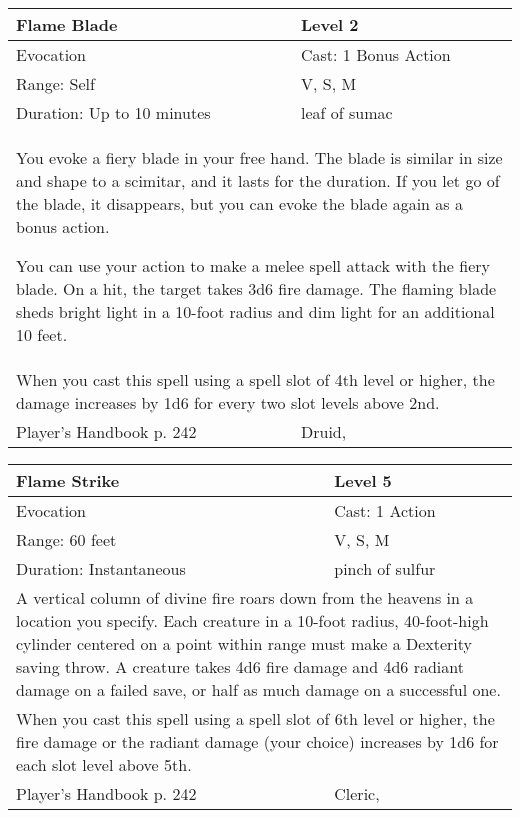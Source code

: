 \documentclass[11pt]{report}
\begin{document}
\begin{table}[H]
	\begin{tabular}{||p{6cm}|p{6cm}||}
		\hline\hline
		\bf{Flame Blade} & Level 2\\ \hline
		Evocation & Cast: 1 Bonus Action\\ \hline
		Range: Self & V, S, M\\ \hline
		Duration: Up to 10 minutes & leaf of sumac\\ \hline
		\multicolumn{2}{||p{12cm}||}{You evoke a fiery blade in your free hand. 
The blade is similar in size and shape to a scimitar, and it lasts for the duration. If you let go of the blade, it disappears, but you can evoke the blade again as a bonus action.

You can use your action to make a melee spell attack with the fiery blade. On a hit, the target takes 3d6 fire damage. 
The flaming blade sheds bright light in a 10-foot radius and dim light for an additional 10 feet.}\\ \hline
		\multicolumn{2}{||p{12cm}||}{When you cast this spell using a spell slot of 4th level or higher, the damage increases by 1d6 for every two slot levels above 2nd.}\\ \hline
Player's Handbook p. 242 & Druid, \\ \hline\hline
	\end{tabular}
\end{table}

\begin{table}[H]
	\begin{tabular}{||p{6cm}|p{6cm}||}
		\hline\hline
		\bf{Flame Strike} & Level 5\\ \hline
		Evocation & Cast: 1 Action\\ \hline
		Range: 60 feet & V, S, M\\ \hline
		Duration: Instantaneous & pinch of sulfur\\ \hline
		\multicolumn{2}{||p{12cm}||}{A vertical column of divine fire roars down from the heavens in a location you specify. Each creature in a 10-foot radius, 40-foot-high cylinder centered on a point within range must make a Dexterity saving throw. A creature takes 4d6 fire damage and 4d6 radiant damage on a failed save, or half as much damage on a successful one.}\\ \hline
		\multicolumn{2}{||p{12cm}||}{When you cast this spell using a spell slot of 6th level or higher, the fire damage or the radiant damage (your choice) increases by 1d6 for each slot level above 5th.}\\ \hline
Player's Handbook p. 242 & Cleric, \\ \hline\hline
	\end{tabular}
\end{table}
\end{document}
